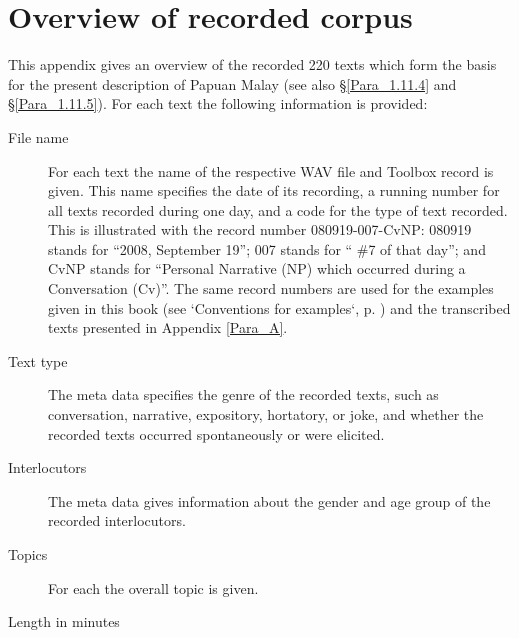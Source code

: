 \chapter{Overview of recorded corpus}
\label{Para_C}
This appendix gives an overview of the recorded 220 texts which form the basis for the present description of Papuan Malay (see also §\ref{Para_1.11.4} and §\ref{Para_1.11.5}). For each text the following information is provided:


\begin{description}
\item[\rmfamily File name] For each text the name of the respective WAV file and Toolbox record is given. This name specifies the date of its recording, a running number for all texts recorded during one day, and a code for the type of text recorded. This is illustrated with the record number 080919-007-CvNP: 080919 stands for “2008, September 19”; 007 stands for “ \#7 of that day”; and CvNP stands for “Personal Narrative (NP) which occurred during a Conversation (Cv)”. The same record numbers are used for the examples given in this book (see ‘Conventions for examples‘, p. \pageref{Para_0}) and the transcribed texts presented in Appendix \ref{Para_A}.

\item[\rmfamily Text type] The meta data specifies the genre of the recorded texts, such as conversation, narrative, expository, hortatory, or joke, and whether the recorded texts occurred spontaneously or were elicited.

\item[\rmfamily Interlocutors] The meta data gives information about the gender and age group of the recorded interlocutors.

\item[\rmfamily Topics] For each  the overall topic is given.

\item[\rmfamily Length in minutes]
\end{description}

